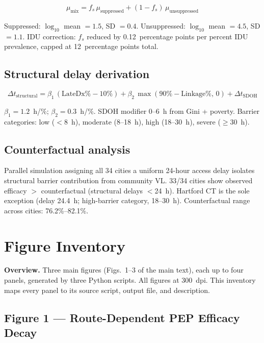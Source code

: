 \documentclass[11pt]{article}
\theoremstyle{definition}
\theoremstyle{remark}
\begin{document}
\begin{equation}
\mu_{\text{mix}} = f_{s}\,\mu_{\text{suppressed}} + (1 - f_{s})\,\mu_{\text{unsuppressed}}
\label{eq:mixture}
\end{equation}

Suppressed: $\log_{10}$ mean $= 1.5$, SD $= 0.4$. Unsuppressed: $\log_{10}$ mean $= 4.5$, SD $= 1.1$. IDU correction: $f_{s}$ reduced by 0.12~percentage points per percent IDU prevalence, capped at 12~percentage points total.

\subsection{Structural delay derivation}

\begin{equation}
\Delta t_{\text{structural}} = \beta_{1}\,(\text{LateDx}\% - 10\%) + \beta_{2}\,\max(90\% - \text{Linkage}\%,\,0) + \Delta t_{\text{SDOH}}
\label{eq:delay_si}
\end{equation}

$\beta_{1} = 1.2$~h/\%; $\beta_{2} = 0.3$~h/\%. SDOH modifier 0--6~h from Gini + poverty. Barrier categories: low ($<$8~h), moderate (8--18~h), high (18--30~h), severe ($\geq$30~h).

\subsection{Counterfactual analysis}

Parallel simulation assigning all 34 cities a uniform 24-hour access delay isolates structural barrier contribution from community VL. 33/34 cities show observed efficacy $>$ counterfactual (structural delays $<$24~h). Hartford CT is the sole exception (delay 24.4~h; high-barrier category, 18--30~h). Counterfactual range across cities: 76.2\%--82.1\%.

\section{Figure Inventory}

\textbf{Overview.} Three main figures (Figs.~1--3 of the main text), each up to four panels, generated by three Python scripts. All figures at 300~dpi. This inventory maps every panel to its source script, output file, and description.

\subsection{Figure 1 --- Route-Dependent PEP Efficacy Decay}
\end{document}
